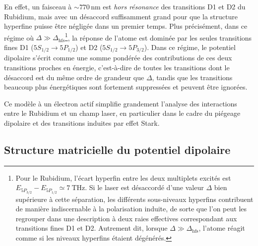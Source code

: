 En effet, un faisceau à \(\sim 770\,\mathrm{nm}\) est \emph{hors résonance} des transitions 
D1 et D2 du Rubidium, mais avec un désaccord suffisamment grand pour que la structure 
hyperfine puisse être négligée dans un premier temps.  
Plus précisément, dans ce régime où 
\(\Delta \gg \Delta_{\mathrm{hfs}}\)\footnote{
Pour le Rubidium, l’écart hyperfin entre les deux multiplets excités est 
\(E_{5P_{3/2}} - E_{5P_{1/2}} \simeq 7~\mathrm{THz}\).  
Si le laser est désaccordé d’une valeur \(\Delta\) bien supérieure à cette séparation, 
les différents sous-niveaux hyperfins contribuent de manière indiscernable à la polarisation 
induite, de sorte que l’on peut les regrouper dans une description à deux raies effectives 
correspondant aux transitions fines D1 et D2.  
Autrement dit, lorsque \(\Delta\gg\Delta_{\mathrm{hfs}}\), l’atome réagit comme si les niveaux 
hyperfins étaient dégénérés.},
la réponse de l’atome est dominée par les seules transitions fines 
D1 (\(5S_{1/2}\rightarrow 5P_{1/2}\)) et D2 (\(5S_{1/2}\rightarrow 5P_{3/2}\)). 
Dans ce régime, le potentiel dipolaire s’écrit comme une somme pondérée des contributions 
de ces deux transitions proches en énergie, 
c’est-à-dire de toutes les transitions dont le désaccord est du même ordre de grandeur que \(\Delta\), 
tandis que les transitions beaucoup plus énergétiques sont fortement suppres­sées et peuvent être ignorées.


\medskip

Ce modèle à un électron actif simplifie grandement l’analyse des interactions entre le Rubidium et un champ laser, en particulier dans le cadre du piégeage dipolaire et des transitions induites par effet Stark.


\subsection{Structure matricielle du potentiel dipolaire}


